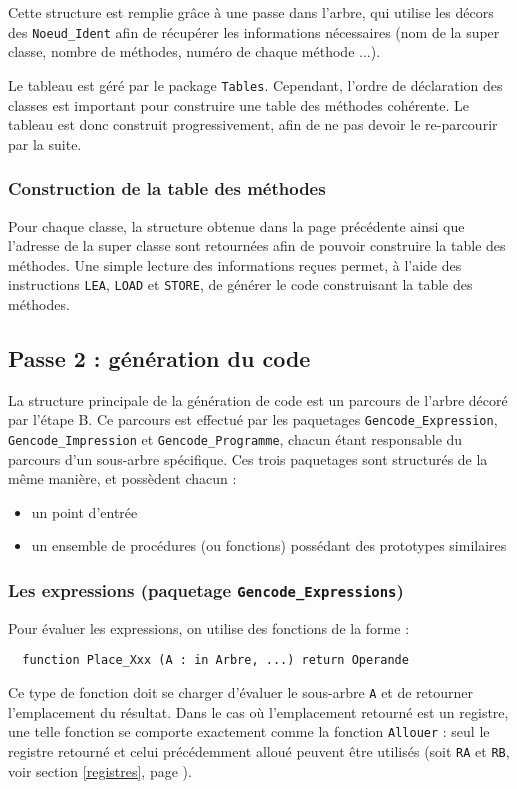 Cette structure est remplie grâce à une passe dans l'arbre, qui utilise les décors des \verb!Noeud_Ident! afin de récupérer les informations nécessaires (nom de la super classe, nombre de méthodes, numéro de chaque méthode ...). 

Le tableau est géré par le package \verb!Tables!. Cependant, l'ordre de déclaration des classes est important pour construire une table des méthodes cohérente.
Le tableau est donc construit progressivement, afin de ne pas devoir le re-parcourir par la suite.

\subsubsection{Construction de la table des méthodes}

Pour chaque classe, la structure obtenue dans la page précédente ainsi que l'adresse de la super classe sont retournées afin de pouvoir construire la table des méthodes.
Une simple lecture des informations reçues permet, à l'aide des instructions \verb!LEA!, \verb!LOAD! et \verb!STORE!, de générer le code construisant la table des méthodes.

\subsection{Passe 2 : génération du code}
La structure principale de la génération de code est un parcours de l'arbre décoré par l'étape B.
Ce parcours est effectué par les paquetages \verb!Gencode_Expression!, \verb!Gencode_Impression! et \verb!Gencode_Programme!, chacun étant responsable du parcours d'un sous-arbre spécifique.
Ces trois paquetages sont structurés de la même manière, et possèdent chacun :
\begin{itemize}
\item un point d'entrée
\item un ensemble de procédures (ou fonctions) possédant des prototypes similaires
\end{itemize}

\subsubsection{Les expressions (paquetage \texttt{Gencode\_Expressions})}

Pour évaluer les expressions, on utilise des fonctions de la forme :
\begin{verbatim}
  function Place_Xxx (A : in Arbre, ...) return Operande
\end{verbatim}
Ce type de fonction doit se charger d'évaluer le sous-arbre \verb!A! et de retourner l'emplacement du résultat.
Dans le cas où l'emplacement retourné est un registre, une telle fonction se comporte exactement comme la fonction \verb!Allouer! : seul le registre retourné et celui précédemment alloué peuvent être utilisés (soit \verb!RA! et \verb!RB!, voir section \ref{registres}, page \pageref{registres}).

